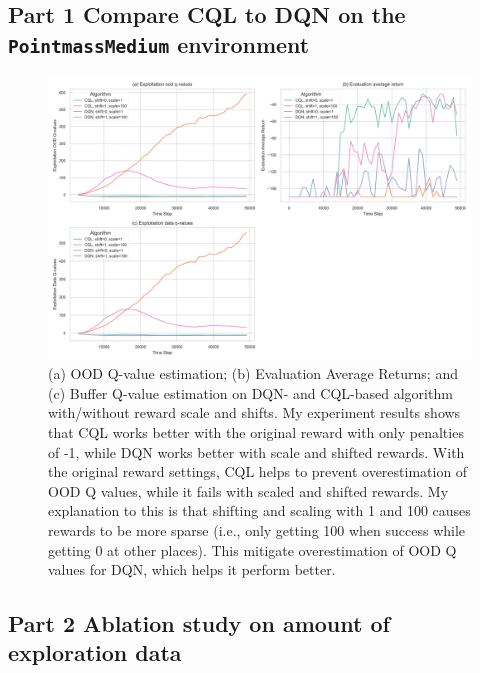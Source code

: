 \documentclass[10pt, letterpaper]{article}
\begin{document}
\subsection*{Part 1 Compare CQL to DQN on the \texttt{PointmassMedium} environment}

\begin{figure}[h!]
    \centering 
    \includegraphics[width=\textwidth]{q2_1.png}
    \caption{(a) OOD Q-value estimation; (b) Evaluation Average Returns; and (c) Buffer Q-value estimation on DQN- and CQL-based algorithm with/without reward scale and shifts. My experiment results shows that CQL works better with the original reward with only penalties of -1, while DQN works better with scale and shifted rewards. With the original reward settings, CQL helps to prevent overestimation of OOD Q values, while it fails with scaled and shifted rewards. My explanation to this is that shifting and scaling with 1 and 100 causes rewards to be more sparse (i.e., only getting 100 when success while getting 0 at other places). This mitigate overestimation of OOD Q values for DQN, which helps it perform better.}
\end{figure}



\subsection*{Part 2 Ablation study on amount of exploration data}
\end{document}
